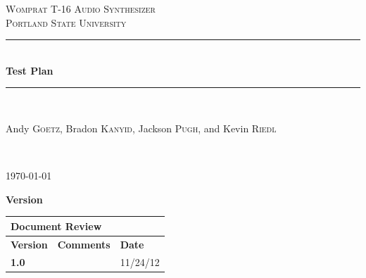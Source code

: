 \documentclass{article}
\newcommand{\HRule}{\rule{\linewidth}{0.5mm}}
\begin{document}
\newenvironment{frcseries}{\fontfamily{frc}\selectfont}{}
\newcommand{\textfrc}[1]{{\frcseries#1}}
\newcommand{\mathfrc}[1]{\text{\textfrc{#1}}}

\begin{titlepage}
 
\begin{center}
 
 
\textsc{\LARGE Womprat T-16 Audio Synthesizer}\\[1.5cm]
 
\textsc{\Large Portland State University}\\[0.5cm]
 
 
\HRule \\[0.4cm]
{ \huge \bfseries Test Plan}\\[0.4cm]
 
\HRule \\[1.5cm]
 
\begin{minipage}{0.4\textwidth}
\begin{center} \large
Andy \textsc{Goetz}, Bradon \textsc{Kanyid}, Jackson \textsc{Pugh}, and Kevin \textsc{Riedl}\\
\end{center}
\end{minipage}

 

 
 
\end{center}
\vfill
{ \textit{} }\\[4.0cm]
\begin{center}
{\large \today}

\end{center} 
\end{titlepage}

\newpage

\textbf{\large Version}
\vspace{.1in}

\begin{tabular}{|p{1in}|p{4in}|p{1in}|}
\hline
\multicolumn{3}{|l|}{\textbf{Document Review}} \\ 
\hline
\textbf{Version}& \textbf{Comments} & \textbf{Date} \\ 
\hline
\textbf{1.0} & & 11/24/12 \\
\hline
\end{tabular}
\end{document}
